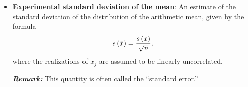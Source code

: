 \begin{itemize}
\item {\bf Experimental standard deviation of the mean}: An estimate of the standard deviation of the distribution of the \hyperref[def:arith_mean]{arithmetic mean}, given by the formula
  \begin{equation}
    s\left( \bar{x} \right) = \dfrac{s\left( x \right)}{\sqrt{n}}, \label{def:exp_st_dev_mean}
  \end{equation}
  where the realizations of $x_j$ are assumed to be linearly uncorrelated.


\smallskip
\textbf{\textit{Remark:}} This quantity is often called the ``standard error.''


  

\end{itemize}
